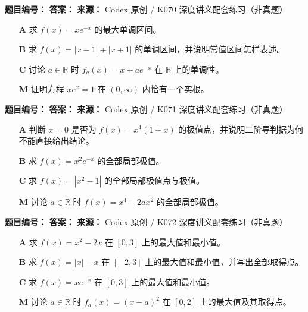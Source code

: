 
\begin{problemBox}
\begin{problemMeta}
\textbf{题目编号：}  \quad
\textbf{答案：}  \quad
\textbf{来源：} Codex 原创 / K070 深度讲义配套练习（非真题）
\end{problemMeta}
\begin{enumerate}
  \item[\textbf{A}] 求 \(f(x)=xe^{-x}\) 的最大单调区间。
  \item[\textbf{B}] 求 \(f(x)=|x-1|+\lvert x+1\rvert\) 的单调区间，并说明常值区间怎样表述。
  \item[\textbf{C}] 讨论 \(a\in\mathbb R\) 时 \(f_a(x)=x+ae^{-x}\) 在 \(\mathbb R\) 上的单调性。
  \item[\textbf{M}] 证明方程 \(xe^x=1\) 在 \((0,\infty)\) 内恰有一个实根。
\end{enumerate}
\end{problemBox}

\begin{problemBox}
\begin{problemMeta}
\textbf{题目编号：}  \quad
\textbf{答案：}  \quad
\textbf{来源：} Codex 原创 / K071 深度讲义配套练习（非真题）
\end{problemMeta}
\begin{enumerate}
  \item[\textbf{A}] 判断 \(x=0\) 是否为 \(f(x)=x^4(1+x)\) 的极值点，并说明二阶导判据为何不能直接给出结论。
  \item[\textbf{B}] 求 \(f(x)=x^2e^{-x}\) 的全部局部极值。
  \item[\textbf{C}] 求 \(f(x)=|x^2-1|\) 的全部局部极值点与极值。
  \item[\textbf{M}] 讨论 \(a\in\mathbb R\) 时 \(f(x)=x^4-2ax^2\) 的全部局部极值。
\end{enumerate}
\end{problemBox}

\begin{problemBox}
\begin{problemMeta}
\textbf{题目编号：}  \quad
\textbf{答案：}  \quad
\textbf{来源：} Codex 原创 / K072 深度讲义配套练习（非真题）
\end{problemMeta}
\begin{enumerate}
  \item[\textbf{A}] 求 \(f(x)=x^2-2x\) 在 \([0,3]\) 上的最大值和最小值。
  \item[\textbf{B}] 求 \(f(x)=|x|-x\) 在 \([-2,3]\) 上的最大值和最小值，并写出全部取得点。
  \item[\textbf{C}] 求 \(f(x)=xe^{-x}\) 在 \([0,3]\) 上的最大值和最小值。
  \item[\textbf{M}] 讨论 \(a\in\mathbb R\) 时 \(f_a(x)=(x-a)^2\) 在 \([0,2]\) 上的最大值及其取得点。
\end{enumerate}
\end{problemBox}

